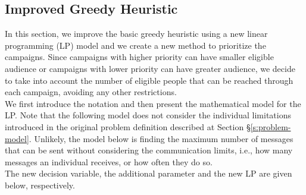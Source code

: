 \documentclass[11pt]{article}
\begin{document}
\subsection{Improved Greedy Heuristic} \label{s:greedy_heuristic_improved}
In this section, we improve the basic greedy heuristic using a new linear programming (LP) model and we create a new method to prioritize the campaigns. Since campaigns with higher priority can have smaller eligible audience or campaigns with lower priority can have greater audience, we decide to take into account the number of eligible people that can be reached through each campaign, avoiding any other restrictions.\\

We first introduce the notation and then present the mathematical model for the LP. Note that the following model does not consider the individual limitations introduced in the original problem definition described at Section \S\ref{s:problem-model}. Unlikely, the model below is finding the maximum number of messages that can be sent without considering the communication limits, i.e., how many messages an individual receives, or how often they do so.\\

\noindent The new decision variable, the additional parameter and the new LP are given below, respectively. \\
\end{document}
